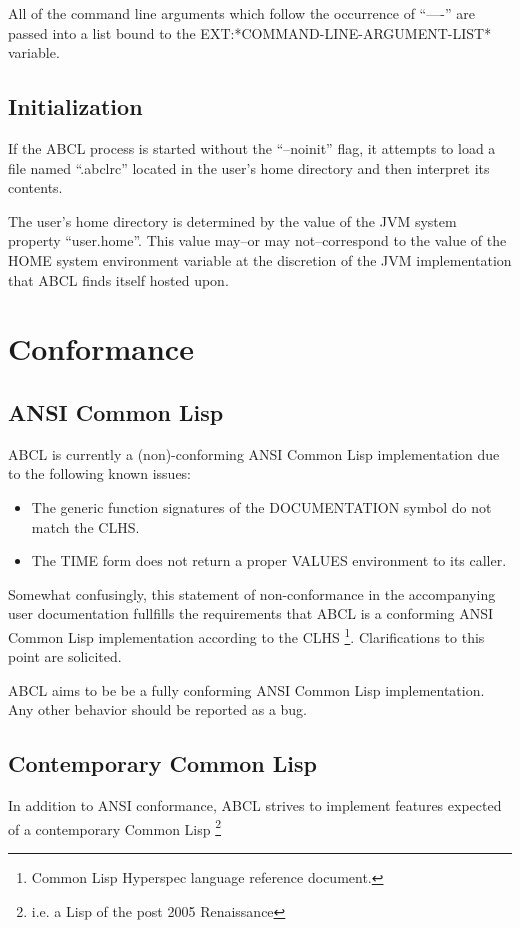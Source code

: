 \documentclass[10pt]{book}
\begin{document}
All of the command line arguments which follow the occurrence of ``----''
are passed into a list bound to the EXT:*COMMAND-LINE-ARGUMENT-LIST*
variable.

\section{Initialization}

If the \textsc{ABCL} process is started without the ``--noinit'' flag, it
attempts to load a file named ``.abclrc'' located in the user's home
directory and then interpret its contents.  

The user's home directory is determined by the value of the JVM system
property ``user.home''.  This value may--or may not--correspond to the
value of the HOME system environment variable at the discretion of the
JVM implementation that \textsc{ABCL} finds itself hosted upon.

\chapter{Conformance}
\label{chapter:conformance}

\section{ANSI Common Lisp}
\textsc{ABCL} is currently a (non)-conforming ANSI Common Lisp
implementation due to the following known issues:

\begin{itemize}
  \item The generic function signatures of the DOCUMENTATION symbol do
    not match the CLHS.
  \item The TIME form does not return a proper VALUES environment to
    its caller.
\end{itemize}

Somewhat confusingly, this statement of non-conformance in the
accompanying user documentation fullfills the requirements that
\textsc{ABCL} is a conforming ANSI Common Lisp implementation
according to the CLHS \footnote{Common Lisp Hyperspec language
  reference document.}.  Clarifications to this point are solicited.

ABCL aims to be be a fully conforming ANSI Common Lisp implementation.
Any other behavior should be reported as a bug.

\section{Contemporary Common Lisp}
In addition to ANSI conformance, \textsc{ABCL} strives to implement features
expected of a contemporary Common Lisp \footnote{i.e. a Lisp of the
  post 2005 Renaissance}
\end{document}

